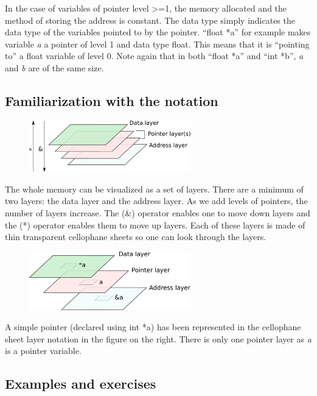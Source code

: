 \documentclass[10pt,twoside]{article}
\begin{document}
In the case of variables of pointer level {\textgreater}=1, the memory allocated
and the method of storing the address is constant. The data type simply
indicates the data type of the variables pointed to by the pointer. ``float *a''
for example makes variable \textit{a }\textup{a pointer of level 1 and data type
float. This means that it is ``pointing to'' a float variable of level 0. Note
again that in both ``float *a'' and ``int *b'', }\textit{a}\textup{ and
}\textit{b }\textup{are of the same size.} \newpage \subsection*{Familiarization
with the notation}

\begin{figure}
\includegraphics[width=70mm]{res/layer-splitup.pdf}
\end{figure}

The whole memory can be visualized as a set of layers. There are a minimum of
two layers: the data layer and the address layer. As we add levels of pointers,
the number of layers increase. The (\&) operator enables one to move down layers
and the (*) operator enables them to move up layers. Each of these layers is
made of thin transparent cellophane sheets so one can look through the layers.

\begin{figure}
\includegraphics[width=70mm]{res/simple-pointer.pdf}
\end{figure}

A simple pointer (declared using int *a) has been represented in the cellophane
sheet layer notation in the figure on the right. There is only one pointer layer
as \textit{a} is a pointer variable.

\subsection*{Examples and exercises}
\end{document}
